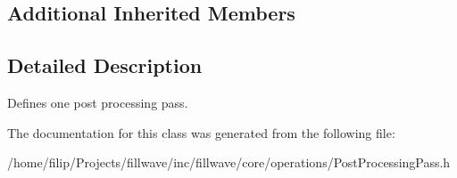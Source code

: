 \subsection*{Additional Inherited Members}


\subsection{Detailed Description}
Defines one post processing pass. 

The documentation for this class was generated from the following file\+:\begin{DoxyCompactItemize}
\item 
/home/filip/\+Projects/fillwave/inc/fillwave/core/operations/Post\+Processing\+Pass.\+h\end{DoxyCompactItemize}
